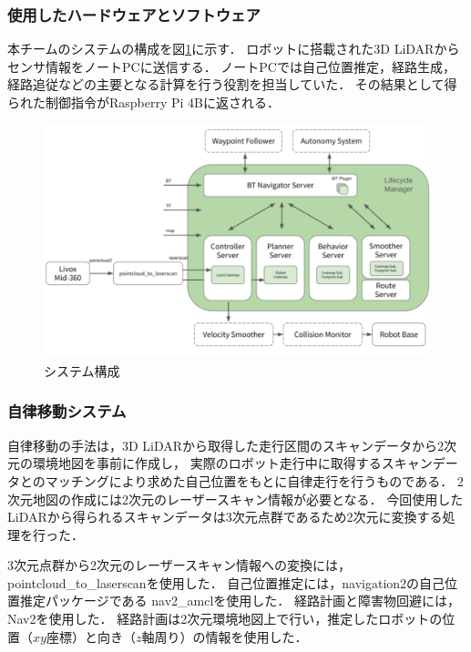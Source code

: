 \documentclass[twocolumn,9pt]{jsproceedings}
\begin{document}
\subsubsection{使用したハードウェアとソフトウェア}

本チームのシステムの構成を図\ref{fig:shinsotu_system_diagram}に示す．
ロボットに搭載された3D LiDARからセンサ情報をノートPCに送信する．
ノートPCでは自己位置推定，経路生成，経路追従などの主要となる計算を行う役割を担当していた．
その結果として得られた制御指令がRaspberry Pi 4Bに返される．

\begin{figure}[h]
  \begin{center}
    \includegraphics[width=1.0\linewidth]{figs/shinsotu_system_diagram.pdf}
    \caption{システム構成 \cite{nav2_docs}}
    \label{fig:shinsotu_system_diagram}
  \end{center}
\end{figure}


\subsubsection{自律移動システム}

自律移動の手法は，3D LiDARから取得した走行区間のスキャンデータから2次元の環境地図を事前に作成し，
実際のロボット走行中に取得するスキャンデータとのマッチングにより求めた自己位置をもとに自律走行を行うものである．
2次元地図の作成には2次元のレーザースキャン情報が必要となる．
今回使用したLiDARから得られるスキャンデータは3次元点群であるため2次元に変換する処理を行った．

3次元点群から2次元のレーザースキャン情報への変換には，pointcloud\_to\_laserscan\cite{pcl_lsc}を使用した．
自己位置推定には，navigation2の自己位置推定パッケージである
nav2\_amclを使用した\cite{nav2_amcl}．
経路計画と障害物回避には，Nav2を使用した\cite{nav2}．
経路計画は2次元環境地図上で行い，推定したロボットの位置（$xy$座標）と向き（$z$軸周り）の情報を使用した．
\end{document}
